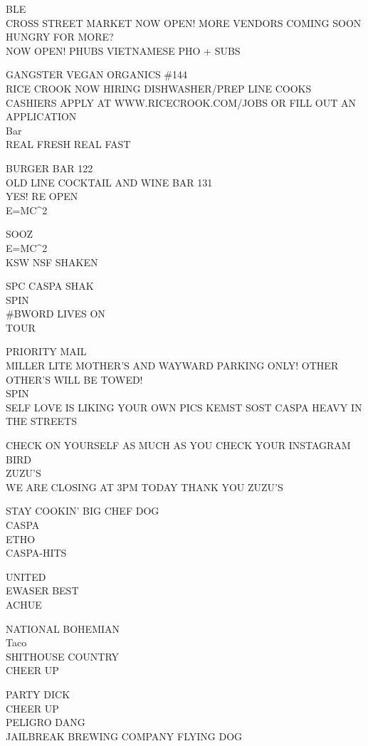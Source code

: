 \documentclass[10pt,letterpaper]{article}
\begin{document}
BLE\\
CROSS STREET MARKET NOW OPEN!  MORE VENDORS COMING SOON\\
HUNGRY FOR MORE?\\
NOW OPEN!  PHUBS VIETNAMESE PHO + SUBS

GANGSTER VEGAN ORGANICS \#144\\
RICE CROOK NOW HIRING DISHWASHER/PREP LINE COOKS CASHIERS APPLY AT WWW.RICECROOK.COM/JOBS OR FILL OUT AN APPLICATION\\
Bar\\
REAL FRESH REAL FAST

BURGER BAR 122\\
OLD LINE COCKTAIL AND WINE BAR 131\\
YES!  RE OPEN\\
E=MC\^{}2

SOOZ\\
E=MC\^{}2\\
KSW NSF SHAKEN

SPC CASPA SHAK\\
SPIN\\
\#BWORD LIVES ON\\
TOUR

PRIORITY MAIL\\
MILLER LITE MOTHER'S AND WAYWARD PARKING ONLY!  OTHER OTHER'S WILL BE TOWED!\\
SPIN\\
SELF LOVE IS LIKING YOUR OWN PICS KEMST SOST CASPA HEAVY IN THE STREETS

CHECK ON YOURSELF AS MUCH AS YOU CHECK YOUR INSTAGRAM\\
BIRD\\
ZUZU'S\\
WE ARE CLOSING AT 3PM TODAY THANK YOU ZUZU'S

STAY COOKIN' BIG CHEF DOG\\
CASPA\\
ETHO\\
CASPA{-}HITS

UNITED\\
EWASER BEST\\
ACHUE

NATIONAL BOHEMIAN\\
Taco\\
SHITHOUSE COUNTRY\\
CHEER UP

PARTY DICK\\
CHEER UP\\
PELIGRO DANG\\
JAILBREAK BREWING COMPANY FLYING DOG
\end{document}

